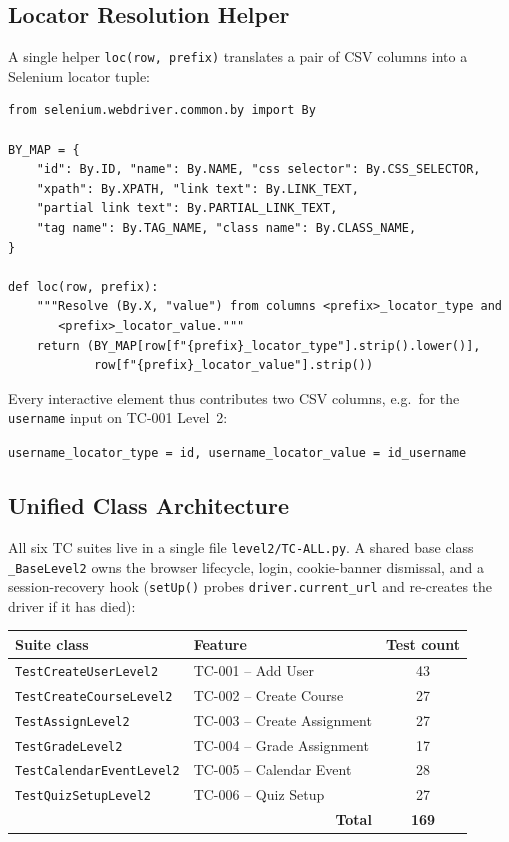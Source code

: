 \documentclass[twoside,final]{hcmut-report}
\begin{document}
\subsection{Locator Resolution Helper}
A single helper \texttt{loc(row, prefix)} translates a pair of CSV columns into a Selenium locator tuple:

\begin{lstlisting}[caption={Locator resolution from CSV},label={lst:loc-helper}]
from selenium.webdriver.common.by import By

BY_MAP = {
    "id": By.ID, "name": By.NAME, "css selector": By.CSS_SELECTOR,
    "xpath": By.XPATH, "link text": By.LINK_TEXT,
    "partial link text": By.PARTIAL_LINK_TEXT,
    "tag name": By.TAG_NAME, "class name": By.CLASS_NAME,
}

def loc(row, prefix):
    """Resolve (By.X, "value") from columns <prefix>_locator_type and
       <prefix>_locator_value."""
    return (BY_MAP[row[f"{prefix}_locator_type"].strip().lower()],
            row[f"{prefix}_locator_value"].strip())
\end{lstlisting}

Every interactive element thus contributes two CSV columns, e.g.\ for the \texttt{username} input on TC-001 Level~2:
\begin{center}
    \texttt{username\_locator\_type = id, \quad username\_locator\_value = id\_username}
\end{center}

\subsection{Unified Class Architecture}
All six TC suites live in a single file \texttt{level2/TC-ALL.py}. A shared base class \texttt{\_BaseLevel2} owns the browser lifecycle, login, cookie-banner dismissal, and a session-recovery hook (\texttt{setUp()} probes \texttt{driver.current\_url} and re-creates the driver if it has died):

\begin{center}
\renewcommand{\arraystretch}{1.3}
\begin{tabular}{|l|l|c|}
\hline
\textbf{Suite class} & \textbf{Feature} & \textbf{Test count} \\ \hline
\texttt{TestCreateUserLevel2} & TC-001 -- Add User & 43 \\ \hline
\texttt{TestCreateCourseLevel2} & TC-002 -- Create Course & 27 \\ \hline
\texttt{TestAssignLevel2} & TC-003 -- Create Assignment & 27 \\ \hline
\texttt{TestGradeLevel2} & TC-004 -- Grade Assignment & 17 \\ \hline
\texttt{TestCalendarEventLevel2} & TC-005 -- Calendar Event & 28 \\ \hline
\texttt{TestQuizSetupLevel2} & TC-006 -- Quiz Setup & 27 \\ \hline
\multicolumn{2}{|r|}{\textbf{Total}} & \textbf{169} \\ \hline
\end{tabular}
\end{center}
\end{document}
